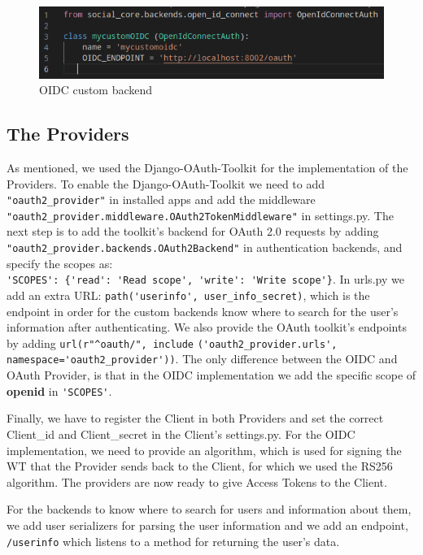\begin{figure}[htb]
	\centering
	\includegraphics[scale=0.6]{figures/customOIDC.png}
	\caption{OIDC custom backend}
\end{figure}




\subsection{The Providers}

As mentioned, we used the Django-OAuth-Toolkit for the implementation of the Providers. To enable the Django-OAuth-Toolkit we need to add \verb|"oauth2_provider"| in installed apps and add the middleware \verb|"oauth2_provider.middleware.OAuth2TokenMiddleware"| in settings.py. The next step is to add the toolkit's backend for OAuth 2.0 requests by adding \verb|"oauth2_provider.backends.OAuth2Backend"| in authentication backends, and specify the scopes as: \\ \verb|'SCOPES': {'read': 'Read scope', 'write': 'Write scope'}|.
In urls.py we add an extra URL: \verb|path('userinfo', user_info_secret)|, which is the endpoint in order for the custom backends know where to search for the user's information after authenticating. We also provide the OAuth toolkit's endpoints by adding \verb|url(r"^oauth/", include| \verb|('oauth2_provider.urls', namespace='oauth2_provider'))|.
The only difference between the OIDC and OAuth Provider, is that in the OIDC implementation we add the specific scope of \textbf{openid} in \verb|'SCOPES'|.

Finally, we have to register the Client in both Providers and set the correct Client\_id and Client\_secret in the Client's settings.py. For the OIDC implementation, we need to provide an algorithm, which is used for signing the WT that the Provider sends back to the Client, for which we used the RS256 algorithm. The providers are now ready to give Access Tokens to the Client.

For the backends to know where to search for users and information about them, we add user serializers for parsing the user information and we add an endpoint, \verb|/userinfo| which listens to a method for returning the user's data.

